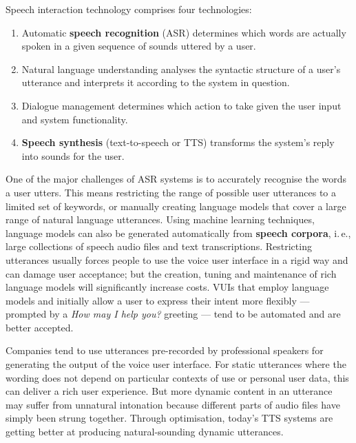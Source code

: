 \begin{multicols}{2}
Speech interaction technology comprises four technologies: 

\begin{enumerate}
\item Automatic \textbf{speech recognition} (ASR) determines which words are actually spoken in a given sequence of sounds uttered by a user.  
\item Natural language understanding analyses the syntactic structure of a user’s utterance and interprets it according to the system in question.
\item Dialogue management determines which action to take given the user input and system functionality.   
\item \textbf{Speech synthesis} (text-to-speech or TTS) transforms the system’s reply into sounds for the user.
\end{enumerate}

One of the major challenges of ASR systems is to accurately recognise the words a user utters. This means restricting the range of possible user utterances to a limited set of keywords, or manually creating language models that cover a large range of natural language utterances. Using machine learning techniques, language models can also be generated automatically from \textbf{speech corpora}, i.\,e., large collections of speech audio files and text transcriptions. Restricting utterances usually forces people to use the voice user interface in a rigid way and can damage user acceptance; but the creation, tuning and maintenance of rich language models will significantly increase costs. VUIs that employ language models and initially allow a user to express their intent more flexibly — prompted by a \textit{How may I help you?} greeting — tend to be automated and are better accepted.

Companies tend to use utterances pre-recorded by professional speakers for generating the output of the voice user interface. For static utterances where the wording does not depend on particular contexts of use or personal user data, this can deliver a rich user experience. But more dynamic content in an utterance may suffer from unnatural intonation because different parts of audio files have simply been strung together. Through optimisation, today’s TTS systems are getting better at producing natural-sounding dynamic utterances.



\end{multicols}
